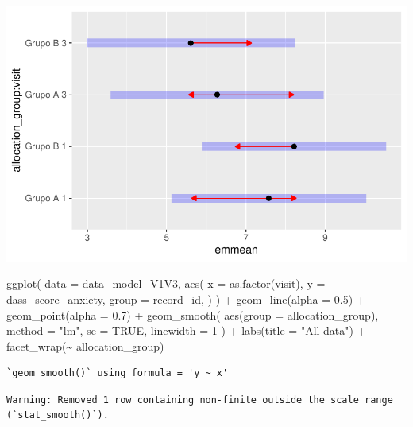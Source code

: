 \documentclass[
  letterpaper,
  DIV=11,
  numbers=noendperiod]{scrartcl}
\newenvironment{Shaded}{\begin{snugshade}}{\end{snugshade}}
\newcommand{\AttributeTok}[1]{\textcolor[rgb]{0.40,0.45,0.13}{#1}}
\newcommand{\ConstantTok}[1]{\textcolor[rgb]{0.56,0.35,0.01}{#1}}
\newcommand{\DecValTok}[1]{\textcolor[rgb]{0.68,0.00,0.00}{#1}}
\newcommand{\FloatTok}[1]{\textcolor[rgb]{0.68,0.00,0.00}{#1}}
\newcommand{\FunctionTok}[1]{\textcolor[rgb]{0.28,0.35,0.67}{#1}}
\newcommand{\NormalTok}[1]{\textcolor[rgb]{0.00,0.23,0.31}{#1}}
\newcommand{\SpecialCharTok}[1]{\textcolor[rgb]{0.37,0.37,0.37}{#1}}
\newcommand{\StringTok}[1]{\textcolor[rgb]{0.13,0.47,0.30}{#1}}
\begin{document}
\includegraphics{Outcomes_V1V2V3_files/figure-pdf/dass_score_anxiety_sens_emm-1.pdf}

\begin{Shaded}
\begin{Highlighting}[]
\FunctionTok{ggplot}\NormalTok{(}
    \AttributeTok{data =}\NormalTok{ data\_model\_V1V3, }
    \FunctionTok{aes}\NormalTok{(}
        \AttributeTok{x =} \FunctionTok{as.factor}\NormalTok{(visit),}
        \AttributeTok{y =}\NormalTok{ dass\_score\_anxiety,}
        \AttributeTok{group =}\NormalTok{ record\_id,}
\NormalTok{    )}
\NormalTok{) }\SpecialCharTok{+}
    \FunctionTok{geom\_line}\NormalTok{(}\AttributeTok{alpha =} \FloatTok{0.5}\NormalTok{) }\SpecialCharTok{+}
    \FunctionTok{geom\_point}\NormalTok{(}\AttributeTok{alpha =} \FloatTok{0.7}\NormalTok{) }\SpecialCharTok{+}
    \FunctionTok{geom\_smooth}\NormalTok{(}
        \FunctionTok{aes}\NormalTok{(}\AttributeTok{group =}\NormalTok{ allocation\_group),}
        \AttributeTok{method =} \StringTok{"lm"}\NormalTok{,}
        \AttributeTok{se =} \ConstantTok{TRUE}\NormalTok{,}
        \AttributeTok{linewidth =} \DecValTok{1}
\NormalTok{    ) }\SpecialCharTok{+}
    \FunctionTok{labs}\NormalTok{(}\AttributeTok{title =} \StringTok{"All data"}\NormalTok{) }\SpecialCharTok{+}
    \FunctionTok{facet\_wrap}\NormalTok{(}\SpecialCharTok{\textasciitilde{}}\NormalTok{ allocation\_group)}
\end{Highlighting}
\end{Shaded}

\begin{verbatim}
`geom_smooth()` using formula = 'y ~ x'
\end{verbatim}

\begin{verbatim}
Warning: Removed 1 row containing non-finite outside the scale range
(`stat_smooth()`).
\end{verbatim}
\end{document}
